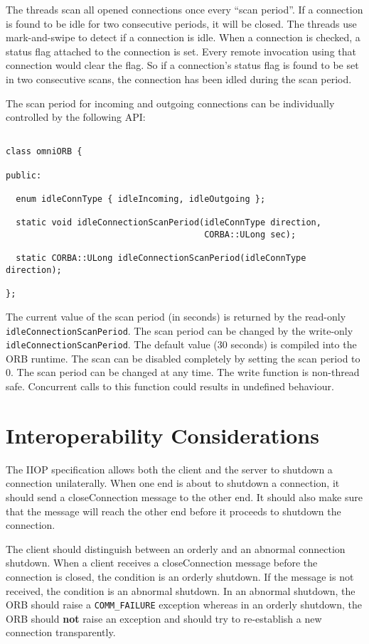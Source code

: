 \documentclass[11pt,twoside,onecolumn]{book}
\begin{document}
The threads scan all opened connections once every ``scan period''. If a
connection is found to be idle for two consecutive periods, it will be
closed. The threads use mark-and-swipe to detect if a connection is idle.
When a connection is checked, a status flag attached to the connection is
set. Every remote invocation using that connection would clear the flag. So
if a connection's status flag is found to be set in two consecutive scans,
the connection has been idled during the  scan period.

The scan period for incoming and outgoing connections can be individually
controlled by the following API:

{\small
\begin{verbatim}

class omniORB {

public:

  enum idleConnType { idleIncoming, idleOutgoing };

  static void idleConnectionScanPeriod(idleConnType direction,
                                       CORBA::ULong sec);

  static CORBA::ULong idleConnectionScanPeriod(idleConnType direction);

};

\end{verbatim}
}

The current value of the scan period (in seconds) is returned by the
read-only {\tt idleConnectionScanPeriod}. The scan period can be changed by
the write-only {\tt idleConnectionScanPeriod}. The default value (30
seconds) is compiled into the ORB runtime. The scan can be disabled
completely by setting the scan period to 0. The scan period can be changed
at any time. The write function is non-thread safe. Concurrent calls to
this function could results in undefined behaviour.

\section{Interoperability Considerations}

The IIOP specification allows both the client and the server to shutdown a
connection unilaterally. When one end is about to shutdown a connection,
it should send a closeConnection message to the other end. It should also make
sure that the message will reach the other end before it proceeds to
shutdown the connection. 

The client should distinguish between an orderly and an abnormal connection
shutdown. When a client receives a closeConnection message before the
connection is closed, the condition is an orderly shutdown. If the message
is not received, the condition is an abnormal shutdown. In an abnormal
shutdown, the ORB should raise a {\tt COMM\_FAILURE} exception whereas in
an orderly shutdown, the ORB should {\bf not} raise an exception and should
try to re-establish a new connection transparently.
\end{document}
